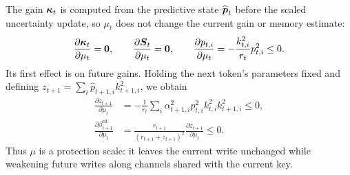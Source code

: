 \documentclass[11pt,letterpaper,logo]{yalearxiv}
\begin{document}
The gain $\boldsymbol{\kappa}_t$ is computed from the predictive state $\widehat{\boldsymbol{p}}_t$ before the
scaled uncertainty update, so $\mu_t$ does not change the current gain or memory estimate:
\begin{equation}
  \frac{\partial\boldsymbol{\kappa}_t}{\partial\mu_t}=\boldsymbol{0},
  \qquad
  \frac{\partial\boldsymbol{S}_t}{\partial\mu_t}=\boldsymbol{0},
  \qquad
  \frac{\partial p_{t,i}}{\partial\mu_t}
  =-\frac{k_{t,i}^2}{r_t}p_{t,i}^2\leq0.
  \label{eq:appendix-protection-current-invariance}
\end{equation}
Its first effect is on future gains. Holding the next token's parameters fixed and defining
$z_{t+1}=\sum_i\widehat p_{t+1,i}k_{t+1,i}^2$, we obtain
\begin{equation}
\begin{aligned}
  \frac{\partial z_{t+1}}{\partial\mu_t}
  &=-\frac{1}{r_t}\sum_i
    \alpha_{t+1,i}^2p_{t,i}^2k_{t,i}^2k_{t+1,i}^2\leq0, \\
  \frac{\partial\beta_{t+1}^{\mathrm{eff}}}{\partial\mu_t}
  &=\frac{r_{t+1}}{(r_{t+1}+z_{t+1})^2}
    \frac{\partial z_{t+1}}{\partial\mu_t}\leq0.
\end{aligned}
  \label{eq:appendix-protection-future-write}
\end{equation}
Thus $\mu$ is a protection scale: it leaves the current write unchanged while weakening future
writes along channels shared with the current key.
\end{document}
